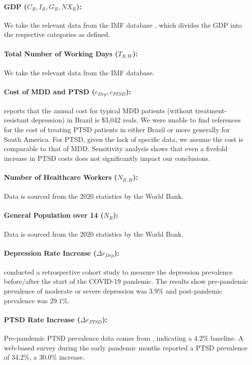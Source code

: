 \documentclass[msom,blindrev]{informs3} %
\begin{document}
\begin{APPENDICES}
\paragraph{GDP ($C_R, I_R, G_R, NX_R$):} We take the relevant data from the IMF database , which divides the GDP into the respective categories as defined.
\paragraph{Total Number of Working Days ($T_{R,W}$):} We take the relevant data from the IMF database.

\paragraph{Cost of MDD and PTSD ($c_{Dep}, c_{PTSD}$):}  reports that the annual cost for typical MDD patients (without treatment-resistant depression) in Brazil is \$3,042 reals. We were unable to find references for the cost of treating PTSD patients in either Brazil or more generally for South America. For PTSD, given the lack of specific data, we assume the cost is comparable to that of MDD. Sensitivity analysis shows that even a fivefold increase in PTSD costs does not significantly impact our conclusions.

\paragraph{Number of Healthcare Workers ($N_{R,H}$):} Data is sourced from the 2020 statistics by the World Bank.

\paragraph{General Population over 14 ($N_{R}$):} Data is sourced from the 2020 statistics by the World Bank.
\paragraph{Depression Rate Increase ($\Delta r_{Dep}$):}  conducted a retrospective cohort study to measure the depression prevalence before/after  the start of the COVID-19 pandemic. The results show pre-pandemic prevalence of moderate or severe depression was $3.9\%$ and post-pandemic prevalence was $29.1\%$. 

\paragraph{PTSD Rate Increase ($\Delta r_{PTSD}$):} Pre-pandemic PTSD prevalence data comes from , indicating a 4.2\% baseline. A web-based survey during the early pandemic months reported a PTSD prevalence of 34.2\%, a 30.0\% increase. 


\end{APPENDICES}
\end{document}
